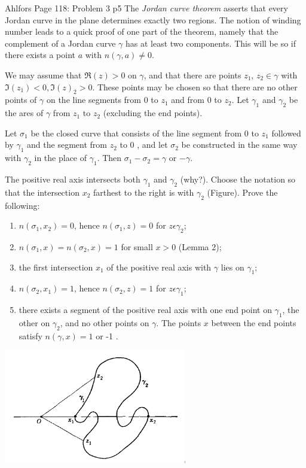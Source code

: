 \documentclass[a4paper, 11pt]{article}
\begin{document}
	\begin{problem}{%
			Ahlfors Page 118: Problem 3
		}{p5%
		}
	\parinn The \textit{Jordan curve theorem} asserts that every Jordan curve in the plane determines exactly two regions. The notion of winding number leads to a quick proof of one part of the theorem, namely that the complement of a Jordan curve $\gamma$ has at least two components. This will be so if there exists a point $a$ with $n(\gamma, a) \neq 0$.
	
	We may assume that $\Re (z)>0$ on $\gamma$, and that there are points $z_1$, $z_2 \in \gamma$ with $\Im (z_1)<0, \Im (z)_2>0$. These points may be chosen so that there are no other points of $\gamma$ on the line segments from 0 to $z_1$ and from 0 to $z_2$. Let $\gamma_1$ and $\gamma_2$ be the ares of $\gamma$ from $z_1$ to $z_2$ (excluding the end points).
	
	Let $\sigma_1$ be the closed curve that consists of the line segment from 0 to $z_1$ followed by $\gamma_1$ and the segment from $z_2$ to 0 , and let $\sigma_2$ be constructed in the same way with $\gamma_2$ in the place of $\gamma_1$. Then $\sigma_1-\sigma_2=\gamma$ or $-\gamma$. 
	
	The positive real axis intersects both $\gamma_1$ and $\gamma_2$ (why?). Choose the notation so that the intersection $x_2$ farthest to the right is with $\gamma_2$ (Figure). Prove the following:
	\begin{enumerate}[label=(\alph*)]
		\item $n\left(\sigma_1, x_2\right)=0$, hence $n\left(\sigma_1, z\right)=0$ for $z \epsilon \gamma_2$;
		\item $n\left(\sigma_1, x\right)=n\left(\sigma_2, x\right)=1$ for small $x>0$ (Lemma 2);
		\item the first intersection $x_1$ of the positive real axis with $\gamma$ lies on $\gamma_1$;
		\item $n\left(\sigma_2, x_1\right)=1$, hence $n\left(\sigma_2, z\right)=1$ for $z \epsilon \gamma_1$;
		\item there exists a segment of the positive real axis with one end point on $\gamma_1$, the other on $\gamma_2$, and no other points on $\gamma$. The points $x$ between the end points satisfy $n(\gamma, x)=1$ or -1 .
		
	\end{enumerate}
\begin{center}
	\begin{minipage}[t]{0.5\linewidth}
		\centering
		\includegraphics[width=8cm]{jct.png}
	\end{minipage}
\end{center}
	\end{problem}
	
\end{document}
